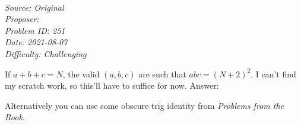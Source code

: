 \SSbreak\\
\emph{Source: Original}\\
\emph{Proposer: \Pnjoy}\\
\emph{Problem ID: 251}\\
\emph{Date: 2021-08-07}\\
\emph{Difficulty: Challenging}\\
\SSbreak

\bigskip

\begin{solution}\hfil\medskip
  
    If $a + b + c = N$, the valid $(a, b, c)$ are such that $abc = (N + 2)^2$. I can't find my scratch work, so this'll have to suffice for now. Answer: \fbox{} \medskip

    Alternatively you can use some obscure trig identity from \textit{Problems from the Book}.
\end{solution}\bigskip
